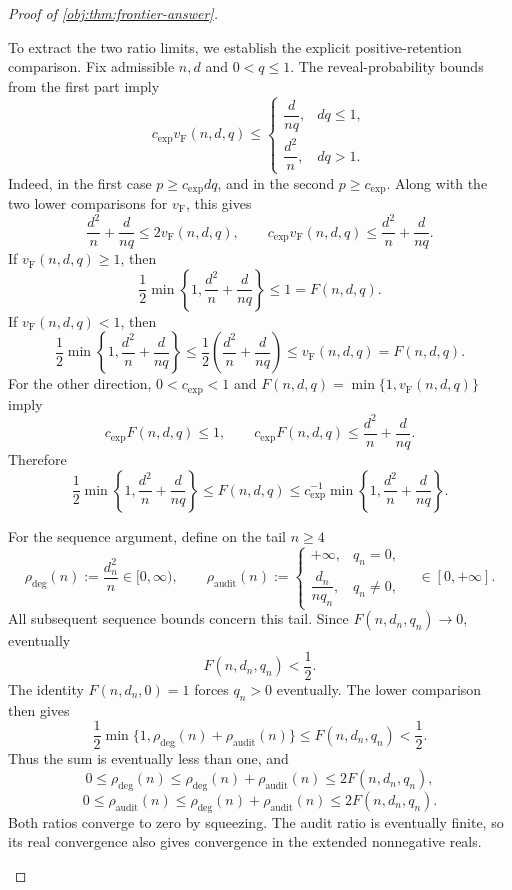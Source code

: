 \begin{proof}[Proof of \cref{obj:thm:frontier-answer}]
\begin{enumerate}
To extract the two ratio limits, we establish the explicit positive-retention comparison. Fix admissible \(n,d\) and \(0<q\le1\). The reveal-probability bounds from the first part imply
\[
c_{\mathrm{exp}}v_{\mathrm{F}}(n,d,q)
\le
\begin{cases}
\dfrac{d}{nq},&dq\le1,\\[4pt]
\dfrac{d^2}{n},&dq>1.
\end{cases}
\]
Indeed, in the first case \(p\ge c_{\mathrm{exp}}dq\), and in the second
\(p\ge c_{\mathrm{exp}}\). Along with the two lower comparisons for
\(v_{\mathrm{F}}\), this gives
\[
\frac{d^2}{n}+\frac{d}{nq}\le2v_{\mathrm{F}}(n,d,q),
\qquad
c_{\mathrm{exp}}v_{\mathrm{F}}(n,d,q)
\le\frac{d^2}{n}+\frac{d}{nq}.
\]
If \(v_{\mathrm{F}}(n,d,q)\ge1\), then
\[
\frac12\min\left\{1,\frac{d^2}{n}+\frac{d}{nq}\right\}
\le1=F(n,d,q).
\]
If \(v_{\mathrm{F}}(n,d,q)<1\), then
\[
\frac12\min\left\{1,\frac{d^2}{n}+\frac{d}{nq}\right\}
\le\frac12\left(\frac{d^2}{n}+\frac{d}{nq}\right)
\le v_{\mathrm{F}}(n,d,q)=F(n,d,q).
\]
For the other direction, \(0<c_{\mathrm{exp}}<1\) and
\(F(n,d,q)=\min\{1,v_{\mathrm{F}}(n,d,q)\}\) imply
\[
c_{\mathrm{exp}}F(n,d,q)\le1,
\qquad
c_{\mathrm{exp}}F(n,d,q)
\le\frac{d^2}{n}+\frac{d}{nq}.
\]
Therefore
\[
\frac12\min\left\{1,\frac{d^2}{n}+\frac{d}{nq}\right\}
\le F(n,d,q)
\le
c_{\mathrm{exp}}^{-1}
\min\left\{1,\frac{d^2}{n}+\frac{d}{nq}\right\}.
\]

For the sequence argument, define on the tail \(n\ge4\)
\[
\rho_{\mathrm{deg}}(n):=\frac{d_n^2}{n}\in[0,\infty),
\qquad
\rho_{\mathrm{audit}}(n):=
\begin{cases}
+\infty,&q_n=0,\\[2pt]
\dfrac{d_n}{nq_n},&q_n\ne0,
\end{cases}
\quad\in[0,+\infty].
\]
All subsequent sequence bounds concern this tail. Since \(F(n,d_n,q_n)\to0\), eventually
\[
F(n,d_n,q_n)<\frac12.
\]
The identity \(F(n,d_n,0)=1\) forces \(q_n>0\) eventually. The lower comparison then gives
\[
\frac12\min\{1,\rho_{\mathrm{deg}}(n)+\rho_{\mathrm{audit}}(n)\}
\le F(n,d_n,q_n)<\frac12.
\]
Thus the sum is eventually less than one, and
\[
0\le\rho_{\mathrm{deg}}(n)
\le\rho_{\mathrm{deg}}(n)+\rho_{\mathrm{audit}}(n)
\le2F(n,d_n,q_n),
\]
\[
0\le\rho_{\mathrm{audit}}(n)
\le\rho_{\mathrm{deg}}(n)+\rho_{\mathrm{audit}}(n)
\le2F(n,d_n,q_n).
\]
Both ratios converge to zero by squeezing. The audit ratio is eventually finite, so its real convergence also gives convergence in the extended nonnegative reals.


\end{enumerate}
\end{proof}
